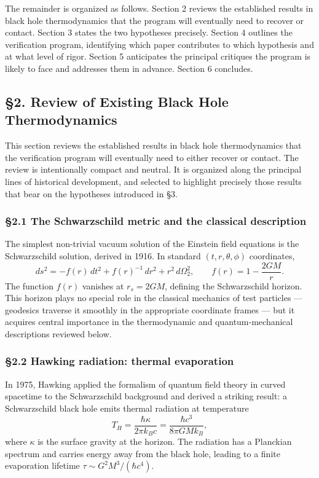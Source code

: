\documentclass[a4paper,11pt]{article}
\theoremstyle{definition}
\begin{document}
The remainder is organized as follows. Section 2 reviews the established
results in black hole thermodynamics that the program will eventually
need to recover or contact. Section 3 states the two hypotheses
precisely. Section 4 outlines the verification program, identifying
which paper contributes to which hypothesis and at what level of rigor.
Section 5 anticipates the principal critiques the program is likely to
face and addresses them in advance. Section 6 concludes.

\subsection{§2. Review of Existing Black Hole
Thermodynamics}\label{review-of-existing-black-hole-thermodynamics}

This section reviews the established results in black hole
thermodynamics that the verification program will eventually need to
either recover or contact. The review is intentionally compact and
neutral. It is organized along the principal lines of historical
development, and selected to highlight precisely those results that bear
on the hypotheses introduced in §3.

\subsubsection{§2.1 The Schwarzschild metric and the classical
description}\label{the-schwarzschild-metric-and-the-classical-description}

The simplest non-trivial vacuum solution of the Einstein field equations
is the Schwarzschild solution, derived in 1916. In standard
\((t, r, \theta, \phi)\) coordinates,
\[ds^2 = -f(r)\, dt^2 + f(r)^{-1}\, dr^2 + r^2 \, d\Omega_2^2, \qquad f(r) = 1 - \frac{2GM}{r}.\]
The function \(f(r)\) vanishes at \(r_s = 2GM\), defining the
Schwarzschild horizon. This horizon plays no special role in the
classical mechanics of test particles --- geodesics traverse it smoothly
in the appropriate coordinate frames --- but it acquires central
importance in the thermodynamic and quantum-mechanical descriptions
reviewed below.

\subsubsection{§2.2 Hawking radiation: thermal
evaporation}\label{hawking-radiation-thermal-evaporation}

In 1975, Hawking applied the formalism of quantum field theory in curved
spacetime to the Schwarzschild background and derived a striking result:
a Schwarzschild black hole emits thermal radiation at temperature
\[T_H = \frac{\hbar \kappa}{2\pi k_B c} = \frac{\hbar c^3}{8\pi G M k_B},\]
where \(\kappa\) is the surface gravity at the horizon. The radiation
has a Planckian spectrum and carries energy away from the black hole,
leading to a finite evaporation lifetime
\(\tau \sim G^2 M^3 / (\hbar c^4)\).
\end{document}
